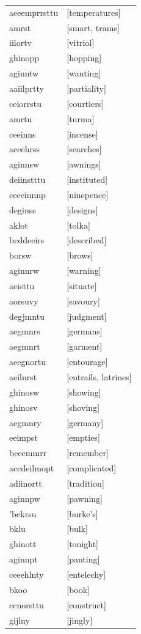 \documentclass{article}
\begin{document}
\begin{tabular}{ll}
aeeemprrsttu & [temperatures] \\
amrst & [smart, trams] \\
iilortv & [vitriol] \\
ghinopp & [hopping] \\
aginntw & [wanting] \\
aaiilprtty & [partiality] \\
ceiorrstu & [courtiers] \\
amrtu & [turma] \\
ceeinns & [incense] \\
aceehrss & [searches] \\
aginnsw & [awnings] \\
deiinstttu & [instituted] \\
ceeeinnnp & [ninepence] \\
deginss & [designs] \\
aklot & [tolka] \\
bcddeeirs & [described] \\
borsw & [brows] \\
aginnrw & [warning] \\
aeisttu & [situate] \\
aorsuvy & [savoury] \\
degjmntu & [judgment] \\
aegmnrs & [germans] \\
aegmnrt & [garment] \\
aeegnortu & [entourage] \\
aeilnrst & [entrails, latrines] \\
ghinosw & [showing] \\
ghinosv & [shoving] \\
aegmnry & [germany] \\
eeimpst & [empties] \\
beeemmrr & [remember] \\
accdeilmopt & [complicated] \\
adiinortt & [tradition] \\
aginnpw & [pawning] \\
'bekrsu & [burke's] \\
bklu & [bulk] \\
ghinott & [tonight] \\
aginnpt & [panting] \\
ceeehlnty & [entelechy] \\
bkoo & [book] \\
ccnorsttu & [construct] \\
gijlny & [jingly] \\

\end{tabular}
\end{document}
